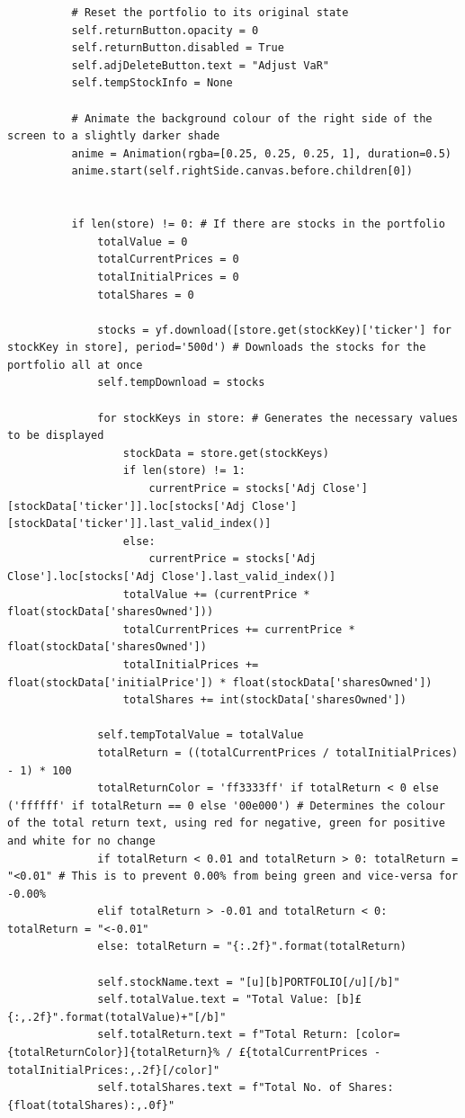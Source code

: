 \documentclass{article}
\begin{document}
\begin{verbatim}
          # Reset the portfolio to its original state
          self.returnButton.opacity = 0
          self.returnButton.disabled = True
          self.adjDeleteButton.text = "Adjust VaR"
          self.tempStockInfo = None

          # Animate the background colour of the right side of the screen to a slightly darker shade
          anime = Animation(rgba=[0.25, 0.25, 0.25, 1], duration=0.5)
          anime.start(self.rightSide.canvas.before.children[0])


          if len(store) != 0: # If there are stocks in the portfolio
              totalValue = 0
              totalCurrentPrices = 0
              totalInitialPrices = 0
              totalShares = 0

              stocks = yf.download([store.get(stockKey)['ticker'] for stockKey in store], period='500d') # Downloads the stocks for the portfolio all at once
              self.tempDownload = stocks

              for stockKeys in store: # Generates the necessary values to be displayed
                  stockData = store.get(stockKeys)
                  if len(store) != 1:
                      currentPrice = stocks['Adj Close'][stockData['ticker']].loc[stocks['Adj Close'][stockData['ticker']].last_valid_index()]
                  else:
                      currentPrice = stocks['Adj Close'].loc[stocks['Adj Close'].last_valid_index()]
                  totalValue += (currentPrice * float(stockData['sharesOwned']))
                  totalCurrentPrices += currentPrice * float(stockData['sharesOwned'])
                  totalInitialPrices += float(stockData['initialPrice']) * float(stockData['sharesOwned'])
                  totalShares += int(stockData['sharesOwned'])

              self.tempTotalValue = totalValue
              totalReturn = ((totalCurrentPrices / totalInitialPrices) - 1) * 100
              totalReturnColor = 'ff3333ff' if totalReturn < 0 else ('ffffff' if totalReturn == 0 else '00e000') # Determines the colour of the total return text, using red for negative, green for positive and white for no change
              if totalReturn < 0.01 and totalReturn > 0: totalReturn = "<0.01" # This is to prevent 0.00% from being green and vice-versa for -0.00%
              elif totalReturn > -0.01 and totalReturn < 0: totalReturn = "<-0.01"
              else: totalReturn = "{:.2f}".format(totalReturn)

              self.stockName.text = "[u][b]PORTFOLIO[/u][/b]"
              self.totalValue.text = "Total Value: [b]£{:,.2f}".format(totalValue)+"[/b]"
              self.totalReturn.text = f"Total Return: [color={totalReturnColor}]{totalReturn}% / £{totalCurrentPrices - totalInitialPrices:,.2f}[/color]"
              self.totalShares.text = f"Total No. of Shares: {float(totalShares):,.0f}"



\end{verbatim}
\end{document}
